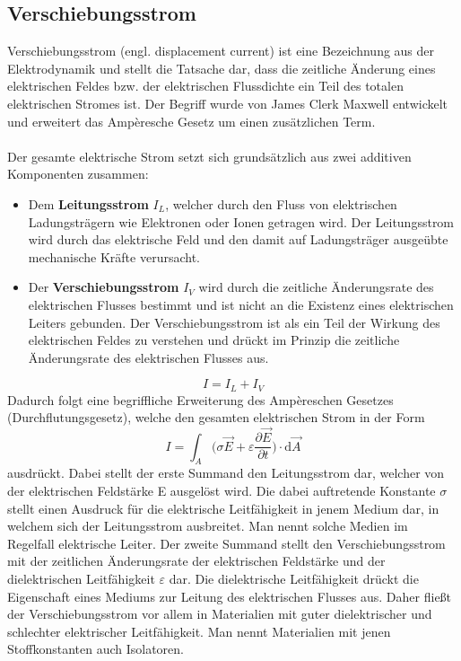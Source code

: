 		\subsection{Verschiebungsstrom}
			Verschiebungsstrom (engl. displacement current) ist eine Bezeichnung aus der Elektrodynamik und stellt die Tatsache dar, dass die zeitliche Änderung eines elektrischen Feldes bzw. der elektrischen Flussdichte ein Teil des totalen elektrischen Stromes ist. Der Begriff wurde von James Clerk Maxwell entwickelt und erweitert das Ampèresche Gesetz um einen zusätzlichen Term.\\\\
			Der gesamte elektrische Strom setzt sich grundsätzlich aus zwei additiven Komponenten zusammen:
			\begin{itemize}
				\item Dem \textbf{Leitungsstrom} $ I_{L} $, welcher durch den Fluss von elektrischen Ladungsträgern wie Elektronen oder Ionen getragen wird. Der Leitungsstrom wird durch das elektrische Feld und den damit auf Ladungsträger ausgeübte mechanische Kräfte verursacht.
				\item Der \textbf{Verschiebungsstrom} $ I_{V} $ wird durch die zeitliche Änderungsrate des elektrischen Flusses bestimmt und ist nicht an die Existenz eines elektrischen Leiters gebunden. Der Verschiebungsstrom ist als ein Teil der Wirkung des elektrischen Feldes zu verstehen und drückt im Prinzip die zeitliche Änderungsrate des elektrischen Flusses aus.
			\end{itemize}
			\[I = I_{L} + I_{V}\]
			Dadurch folgt eine begriffliche Erweiterung des Ampèreschen Gesetzes (Durchflutungsgesetz), welche den gesamten elektrischen Strom in der Form								
			\[I = \int_{A} \bigg(\sigma \vec{E} + \varepsilon \frac{\partial \vec{E}}{\partial t}\bigg) \cdot \mathrm{d}\vec{A}\]
			ausdrückt. Dabei stellt der erste Summand den Leitungsstrom dar, welcher von der elektrischen Feldstärke E ausgelöst wird. Die dabei auftretende Konstante $ \sigma $ stellt einen Ausdruck für die elektrische Leitfähigkeit in jenem Medium dar, in welchem sich der Leitungsstrom ausbreitet. Man nennt solche Medien im Regelfall elektrische Leiter.			
			Der zweite Summand stellt den Verschiebungsstrom mit der zeitlichen Änderungsrate der elektrischen Feldstärke und der dielektrischen Leitfähigkeit $\varepsilon $ dar. Die dielektrische Leitfähigkeit drückt die Eigenschaft eines Mediums zur Leitung des elektrischen Flusses aus. Daher fließt der Verschiebungsstrom vor allem in Materialien mit guter dielektrischer und schlechter elektrischer Leitfähigkeit. Man nennt Materialien mit jenen Stoffkonstanten auch Isolatoren.
